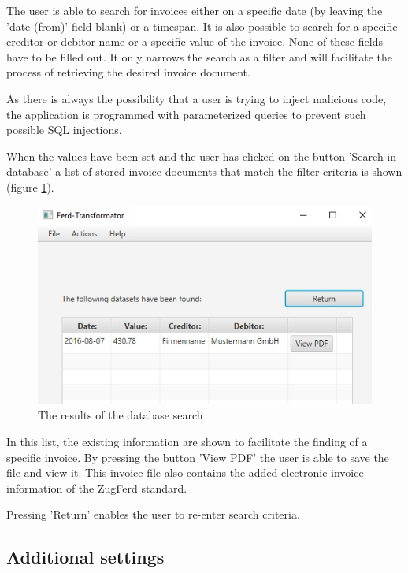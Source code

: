 The user is able to search for invoices either on a specific date (by leaving the 'date (from)' field blank) or a timespan.
It is also possible to search for a specific creditor or debitor name or a specific value of the invoice.
None of these fields have to be filled out. It only narrows the search as a filter and will facilitate the process of retrieving the desired invoice document.

As there is always the possibility that a user is trying to inject malicious code, the application is programmed with parameterized queries to prevent such possible SQL injections.

When the values have been set and the user has clicked on the button 'Search in database' a list of stored invoice documents that match the filter criteria is shown (figure \ref{searchResults}).

\begin{figure}[ht!]
\centering
\includegraphics[scale=0.6]{Images/GUI/SearchResults.jpg}
\caption{The results of the database search \label{searchResults}}
\end{figure}

In this list, the existing information are shown to facilitate the finding of a specific invoice. By pressing the button 'View PDF' the user is able to save the file and view it. This invoice file also contains the added electronic invoice information of the ZugFerd standard.

Pressing 'Return' enables the user to re-enter search criteria. 

\subsection{Additional settings}
\label{sec5.8.3}

